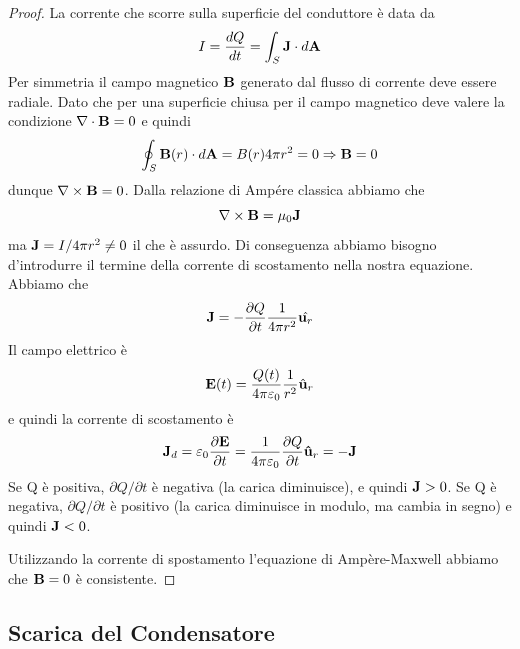 \begin{proof}
	La corrente che scorre sulla superficie del conduttore \`e data da
	\begin{equation*}
		I = \frac{dQ}{dt} = \int_{S} \bold{J} \cdot d \bold{A}
	\end{equation*}
Per simmetria il campo magnetico $\bold{B}$ generato dal flusso di corrente deve essere radiale. Dato che per una superficie chiusa per il campo magnetico deve valere la condizione  $\nabla \cdot \bold{B} = 0 $ e quindi 
\begin{equation*}
	\oint_{S} \bold{B}(r) \cdot d\bold{A} = B(r)4\pi r^2 = 0 \Rightarrow  \bold{B} = 0
\end{equation*}
dunque $\nabla \times \bold{B} = 0$. Dalla relazione di Amp\'ere classica abbiamo che 
\begin{equation*}
	\nabla \times \bold{B} = \mu_0 \bold{J}
\end{equation*}
ma $\bold{J} = I / 4 \pi r^2 \neq 0$ il che \`e assurdo. Di conseguenza abbiamo bisogno d'introdurre il termine della corrente di scostamento nella nostra equazione. Abbiamo che 
\begin{equation*}
	\bold{J} = - \frac{\partial Q}{\partial t} \frac{1}{4 \pi r^2} \hat{\bold{u}_{r}}
\end{equation*}
Il campo elettrico \`e 
\begin{equation*}
	\bold{E}(t) = \frac{Q(t)}{4 \pi \varepsilon_0} \frac{1}{r^2}\hat{\bold{u}}_r
\end{equation*}
e quindi la corrente di scostamento \`e 
\begin{equation*}
	\bold{J}_d = \varepsilon_0 \frac{\partial \bold{E}}{\partial t} = \frac{1}{4\pi \varepsilon_0}\frac{\partial Q}{\partial t} \bold{\hat{u}}_r = -\bold{J}
\end{equation*}
Se Q \`e positiva, $\partial Q / \partial t$ \`e negativa (la carica diminuisce), e quindi $\bold{J} >0$.
Se Q \`e negativa, $\partial Q / \partial t$ \`e positivo (la carica diminuisce in modulo, ma cambia in segno) e quindi $\bold{J} < 0$.

Utilizzando la corrente di spostamento l'equazione di Amp\`ere-Maxwell abbiamo che $\bold{B} =0 $ \`e consistente. 

\end{proof}

\subsection{Scarica del Condensatore }

